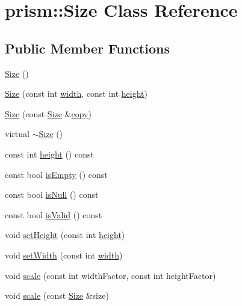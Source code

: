 \hypertarget{classprism_1_1_size}{}\section{prism\+:\+:Size Class Reference}
\label{classprism_1_1_size}
\subsection*{Public Member Functions}
\begin{DoxyCompactItemize}
\item 
\hyperlink{classprism_1_1_size_a61acf22a770bbca569b56d860bb95d0b}{Size} ()
\item 
\hyperlink{classprism_1_1_size_a115a8c5c7fcd709f2eaaff6e7a6c833a}{Size} (const int \hyperlink{classprism_1_1_size_a596f8cbdf0baa999e9652c702d58f0f3}{width}, const int \hyperlink{classprism_1_1_size_a1be5292609e9061f9637edc0d436e7eb}{height})
\item 
\hyperlink{classprism_1_1_size_a3eea778ebcf91dab6b8723fc5b7695e8}{Size} (const \hyperlink{classprism_1_1_size}{Size} \&\hyperlink{namespaceprism_ae776f4cd825f79e7af1cf6ee1d90a209}{copy})
\item 
virtual \hyperlink{classprism_1_1_size_a9c35e71baec3f4c1f2e888e41d5d6a24}{$\sim$\+Size} ()
\item 
const int \hyperlink{classprism_1_1_size_a1be5292609e9061f9637edc0d436e7eb}{height} () const 
\item 
const bool \hyperlink{classprism_1_1_size_a3a0aeaee6472ff145b6f308804f7c3a9}{is\+Empty} () const 
\item 
const bool \hyperlink{classprism_1_1_size_a1a10e8d131a5af7343f09749d01d5312}{is\+Null} () const 
\item 
const bool \hyperlink{classprism_1_1_size_a43047aee2065808f7cd43c6c4c717ceb}{is\+Valid} () const 
\item 
void \hyperlink{classprism_1_1_size_ab35fc21d1dfe330b8b589b1afb92de14}{set\+Height} (const int \hyperlink{classprism_1_1_size_a1be5292609e9061f9637edc0d436e7eb}{height})
\item 
void \hyperlink{classprism_1_1_size_a52a5e068c0346e6fcabe7002eb84ff7b}{set\+Width} (const int \hyperlink{classprism_1_1_size_a596f8cbdf0baa999e9652c702d58f0f3}{width})
\item 
void \hyperlink{classprism_1_1_size_ab97f1b2b8d01ef85ad106590b7a359b7}{scale} (const int width\+Factor, const int height\+Factor)
\item 
void \hyperlink{classprism_1_1_size_a51e5b4604ec60acb92248969420d6d9e}{scale} (const \hyperlink{classprism_1_1_size}{Size} \&size)

\end{DoxyCompactItemize}
